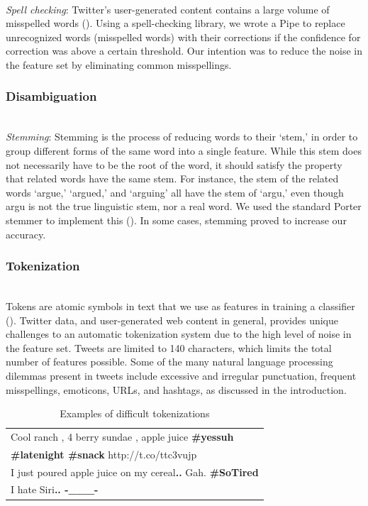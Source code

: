\documentclass[letterpaper]{article}
\begin{document}
~\\
\textit{Spell checking}: Twitter's user-generated content contains a large volume of misspelled words (\citeauthor{Laboreiro:2010:TMM:1871840.1871853}). Using a spell-checking library, we wrote a Pipe to replace unrecognized words (misspelled words) with their corrections if the confidence for correction was above a certain threshold. Our intention was to reduce the noise in the feature set by eliminating common misspellings.
~\\
\subsubsection{Disambiguation}
~\\
\textit{Stemming}: Stemming is the process of reducing words to their `stem,' in order to group different forms of the same word into a single feature. While this stem does not necessarily have to be the root of the word, it should satisfy the property that related words have the same stem. For instance, the stem of the related words `argue,' `argued,' and `arguing' all have the stem of `argu,' even though argu is not the true linguistic stem, nor a real word. We used the standard Porter stemmer to implement this (\citeauthor{porter_1980}).
In some cases, stemming proved to increase our accuracy.
\\

\subsubsection{Tokenization}
~\\
Tokens are atomic symbols in text that we use as features in training a classifier (\citeauthor{Laboreiro:2010:TMM:1871840.1871853}). Twitter data, and user-generated web content in general, provides unique challenges to an automatic tokenization system due to the high level of noise in the feature set. Tweets are limited to 140 characters, which limits the total number of features possible. Some of the many natural language processing dilemmas present in tweets include excessive and irregular punctuation, frequent misspellings, emoticons, URLs, and hashtags, as discussed in the introduction.\\

\begin{table}[h]
\centering
\begin{tabular}{|l|}
	\hline
	Cool ranch , 4 berry sundae , apple juice \textbf{\#yessuh} \\ 
	\textbf{\#latenight \#snack} http://t.co/ttc3vujp \\ \hline
	I just poured apple juice on my cereal\textbf{..} Gah. \textbf{\#SoTired} \\ \hline
	I hate Siri\textbf{.. -\_\_\_-} \\
	\hline
\end{tabular}
\caption{Examples of difficult tokenizations}
\label{tab:tokenization_examples}
\end{table}
\end{document}
